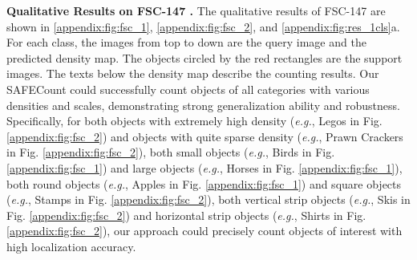 \documentclass[10pt,twocolumn,letterpaper]{article}
\newcommand{\method}{SAFECount\xspace}
\begin{document}
\vspace{2pt}\noindent\textbf{Qualitative Results on FSC-147 \cite{famnet}.} 
The qualitative results of FSC-147 are shown in  \cref{appendix:fig:fsc_1}, \cref{appendix:fig:fsc_2}, and \cref{appendix:fig:res_1cls}a. 
For each class, the images from top to down are the query image and the predicted density map. 
The objects circled by the red rectangles are the support images. 
The texts below the density map describe the counting results. 
Our \method could successfully count objects of all categories with various densities and scales, demonstrating strong generalization ability and robustness. 
Specifically, for both objects with extremely high density (\textit{e.g.}, Legos in Fig. \ref{appendix:fig:fsc_2}) and objects with quite sparse density (\textit{e.g.}, Prawn Crackers in Fig. \ref{appendix:fig:fsc_2}), both small objects (\textit{e.g.}, Birds in Fig. \ref{appendix:fig:fsc_1}) and large objects (\textit{e.g.}, Horses in Fig. \ref{appendix:fig:fsc_1}), both round objects (\textit{e.g.}, Apples in Fig. \ref{appendix:fig:fsc_1}) and square objects (\textit{e.g.}, Stamps in Fig. \ref{appendix:fig:fsc_2}), both vertical strip objects (\textit{e.g.}, Skis in Fig. \ref{appendix:fig:fsc_2}) and horizontal strip objects (\textit{e.g.}, Shirts in Fig. \ref{appendix:fig:fsc_2}), our approach could precisely count objects of interest with high localization accuracy. 
\end{document}
